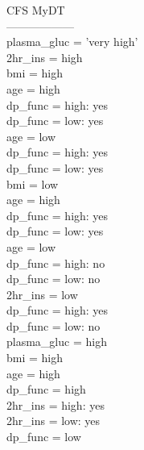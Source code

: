 \documentclass[12pt]{article}
\begin{document}
CFS MyDT \\
------------------ \\
plasma\_gluc = 'very high'\\
\textbar\quad 2hr\_ins = high\\
\textbar\quad \textbar\quad bmi = high\\
\textbar\quad \textbar\quad \textbar\quad age = high\\
\textbar\quad \textbar\quad \textbar\quad \textbar\quad dp\_func = high: yes\\
\textbar\quad \textbar\quad \textbar\quad \textbar\quad dp\_func = low: yes\\
\textbar\quad \textbar\quad \textbar\quad age = low\\
\textbar\quad \textbar\quad \textbar\quad \textbar\quad dp\_func = high: yes\\
\textbar\quad \textbar\quad \textbar\quad \textbar\quad dp\_func = low: yes\\
\textbar\quad \textbar\quad bmi = low\\
\textbar\quad \textbar\quad \textbar\quad age = high\\
\textbar\quad \textbar\quad \textbar\quad \textbar\quad dp\_func = high: yes\\
\textbar\quad \textbar\quad \textbar\quad \textbar\quad dp\_func = low: yes\\
\textbar\quad \textbar\quad \textbar\quad age = low\\
\textbar\quad \textbar\quad \textbar\quad \textbar\quad dp\_func = high: no\\
\textbar\quad \textbar\quad \textbar\quad \textbar\quad dp\_func = low: no\\
\textbar\quad 2hr\_ins = low\\
\textbar\quad \textbar\quad dp\_func = high: yes\\
\textbar\quad \textbar\quad dp\_func = low: no\\
plasma\_gluc = high\\
\textbar\quad bmi = high\\
\textbar\quad \textbar\quad age = high\\
\textbar\quad \textbar\quad \textbar\quad dp\_func = high\\
\textbar\quad \textbar\quad \textbar\quad \textbar\quad 2hr\_ins = high: yes\\
\textbar\quad \textbar\quad \textbar\quad \textbar\quad 2hr\_ins = low: yes\\
\textbar\quad \textbar\quad \textbar\quad dp\_func = low\\
\end{document}
